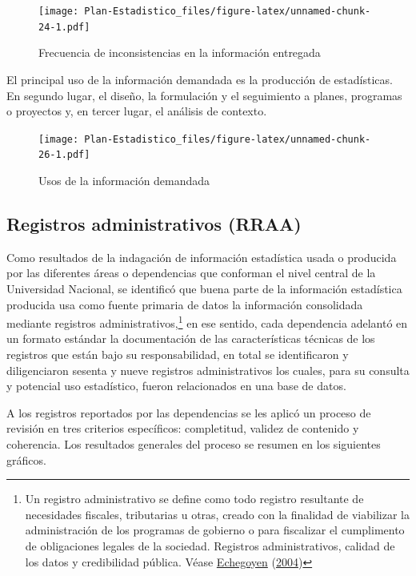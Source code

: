 \documentclass[
]{book}
\begin{document}
\begin{figure}
\centering
\texttt{[image: Plan-Estadistico\_files/figure-latex/unnamed-chunk-24-1.pdf]}
\caption{\label{fig:unnamed-chunk-24}Frecuencia de inconsistencias en la información entregada}
\end{figure}

El principal uso de la información demandada es la producción de estadísticas. En segundo lugar, el diseño, la formulación y el seguimiento a planes, programas o proyectos y, en tercer lugar, el análisis de contexto.

\begin{figure}
\centering
\texttt{[image: Plan-Estadistico\_files/figure-latex/unnamed-chunk-26-1.pdf]}
\caption{\label{fig:unnamed-chunk-26}Usos de la información demandada}
\end{figure}

\hypertarget{registros-administrativos-rraa}{%
\subsection{Registros administrativos (RRAA)}\label{registros-administrativos-rraa}}

Como resultados de la indagación de información estadística usada o producida por las diferentes
áreas o dependencias que conforman el nivel central de la Universidad Nacional, se identificó que
buena parte de la información estadística producida usa como fuente primaria de datos la
información consolidada mediante registros administrativos,\footnote{Un registro administrativo se define como todo registro resultante de necesidades fiscales, tributarias u otras, creado con la finalidad de viabilizar la administración de los programas de gobierno o para fiscalizar el
  cumplimento de obligaciones legales de la sociedad. Registros administrativos, calidad de los datos y
  credibilidad pública. Véase \protect\hyperlink{ref-echegoyen2004registros}{Echegoyen} (\protect\hyperlink{ref-echegoyen2004registros}{2004})} en ese sentido, cada dependencia
adelantó en un formato estándar la documentación de las características técnicas de los registros
que están bajo su responsabilidad, en total se identificaron y diligenciaron sesenta y nueve
registros administrativos los cuales, para su consulta y potencial uso estadístico, fueron
relacionados en una base de datos.

A los registros reportados por las dependencias se les aplicó un proceso de revisión en tres
criterios específicos: completitud, validez de contenido y coherencia. Los resultados generales del
proceso se resumen en los siguientes gráficos.
\end{document}
